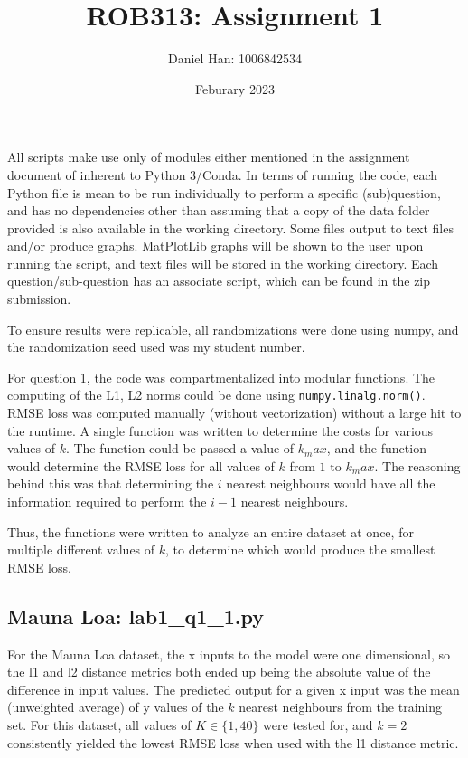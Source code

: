 

\title{ROB313: Assignment 1}
\author{Daniel Han: 1006842534}
\date{Feburary 2023}



\maketitle

All scripts make use only of modules either mentioned in the assignment document of inherent to Python 3/Conda. In terms of running the code, each Python file is mean to be run individually to perform a specific (sub)question, and has no dependencies other than assuming that a copy of the data folder provided is also available in the working directory. Some files output to text files and/or produce graphs. MatPlotLib graphs will be shown to the user upon running the script, and text files will be stored in the working directory. Each question/sub-question has an associate script, which can be found in the zip submission.

To ensure results were replicable, all randomizations were done using numpy, and the randomization seed used was my student number.

For question 1, the code was compartmentalized into modular functions. The computing of the L1, L2 norms could be done using \texttt{numpy.linalg.norm()}. RMSE loss was computed manually (without vectorization) without a large hit to the runtime. A single function was written to determine the costs for various values of $k$. The function could be passed a value of $k_max$, and the function would determine the RMSE loss for all values of $k$ from $1$ to $k_max$. The reasoning behind this was that determining the $i$ nearest neighbours would have all the information required to perform the $i-1$ nearest neighbours.

Thus, the functions were written to analyze an entire dataset at once, for multiple different values of $k$, to determine which would produce the smallest RMSE loss.

\subsection{Mauna Loa: lab1\_q1\_1.py}

For the Mauna Loa dataset, the x inputs to the model were one dimensional, so the l1 and l2 distance metrics both ended up being the absolute value of the difference in input values. The predicted output for a given x input was the mean (unweighted average) of y values of the $k$ nearest neighbours from the training set. For this dataset, all values of $K \in \{1, 40\}$ were tested for, and $k=2$ consistently yielded the lowest RMSE loss when used with the l1 distance metric.

